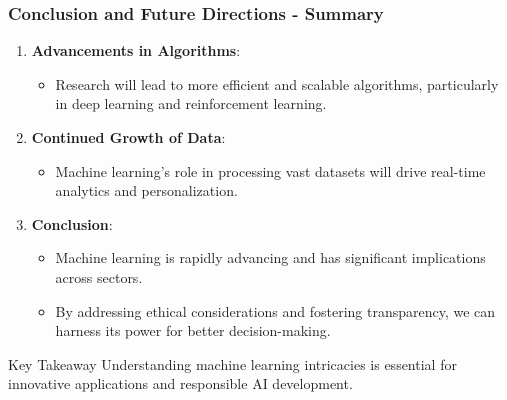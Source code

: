 \documentclass[aspectratio=169]{beamer}
\begin{document}
\begin{frame}[fragile]
    \frametitle{Conclusion and Future Directions - Summary}
    \begin{enumerate}
        \item \textbf{Advancements in Algorithms}:
        \begin{itemize}
            \item Research will lead to more efficient and scalable algorithms, particularly in deep learning and reinforcement learning.
        \end{itemize}

        \item \textbf{Continued Growth of Data}:
        \begin{itemize}
            \item Machine learning's role in processing vast datasets will drive real-time analytics and personalization.
        \end{itemize}

        \item \textbf{Conclusion}:
        \begin{itemize}
            \item Machine learning is rapidly advancing and has significant implications across sectors.
            \item By addressing ethical considerations and fostering transparency, we can harness its power for better decision-making.
        \end{itemize}
    \end{enumerate}
    
    \begin{block}{Key Takeaway}
        Understanding machine learning intricacies is essential for innovative applications and responsible AI development.
    \end{block}
\end{frame}
\end{document}
